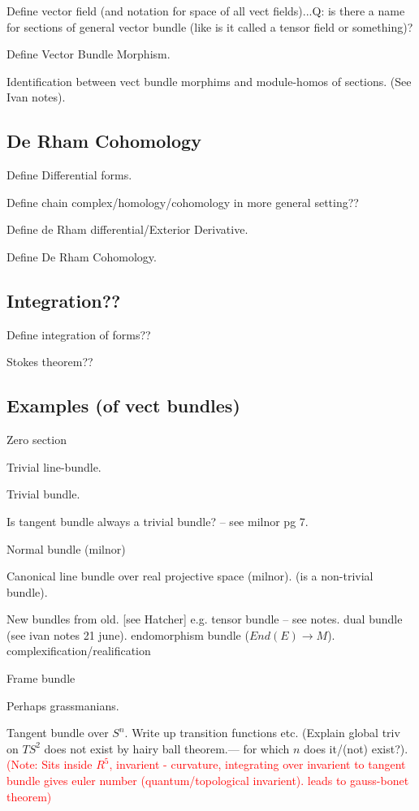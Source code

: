 \documentclass[a4paper]{article}
\theoremstyle{definition} \newtheorem*{definition}{Definition}
\theoremstyle{definition} \newtheorem*{definitions}{Definitions}
\theoremstyle{plain} \newtheorem{theorem}{Theorem}[section]
\theoremstyle{plain} \newtheorem{proposition}[theorem]{Proposition}
\theoremstyle{plain} \newtheorem{corollary}[theorem]{Corollary}
\theoremstyle{plain} \newtheorem{lemma}[theorem]{Lemma}
\theoremstyle{plain} \newtheorem{example}[theorem]{Example}
\newcommand{\understandBetter}[1]{\textcolor{red}{#1}}
\begin{document}
Define vector field (and notation for space of all vect fields)...Q: is there a name for sections of general vector bundle (like is it called a tensor field or something)?

Define Vector Bundle Morphism.

Identification between vect bundle morphims and module-homos of sections. (See Ivan notes).

\subsection{De Rham Cohomology}

Define Differential forms.

Define chain complex/homology/cohomology in more general setting??

Define de Rham differential/Exterior Derivative.

Define De Rham Cohomology.

\subsection{Integration??}

Define integration of forms??

Stokes theorem??

\subsection{Examples (of vect bundles)}

Zero section

Trivial line-bundle.

Trivial bundle.

Is tangent bundle always a trivial bundle? -- see milnor pg 7.

Normal bundle (milnor)

Canonical line bundle over real projective space (milnor). (is a non-trivial bundle).

New bundles from old. [see Hatcher]
e.g. tensor bundle -- see notes.
dual bundle (see ivan notes 21 june).
endomorphism bundle ($End(E)\to M$).
complexification/realification

Frame bundle

Perhaps grassmanians.

Tangent bundle over $S^n$. Write up transition functions etc.
(Explain global triv on $TS^2$ does not exist by hairy ball theorem.--- for which $n$ does it/(not) exist?).
\understandBetter{(Note: Sits inside $R^5$, invarient - curvature, integrating over invarient to tangent bundle gives euler number (quantum/topological invarient). leads to gauss-bonet theorem)}
\end{document}
